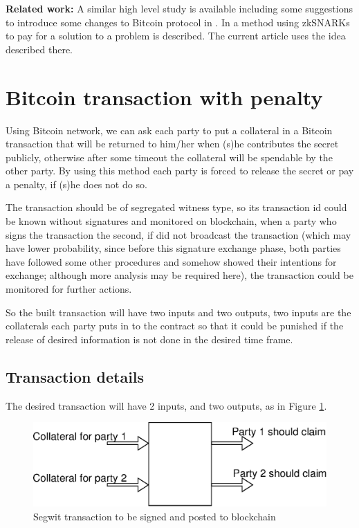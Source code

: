 \documentclass[]{article}
\begin{document}
\textbf{Related work:} A similar high level study is available including some suggestions to introduce some changes to Bitcoin protocol in \cite{andrychowicz}. In \cite{maxwell2016} a method using zkSNARKs\cite{ethzkSNARK} to pay for a solution to a problem is described. The current article uses the idea described there.

\section{Bitcoin transaction with penalty}
Using Bitcoin network, we can ask each party to put a collateral in a Bitcoin transaction that will be returned to him/her when (s)he contributes the secret publicly, otherwise after some timeout the collateral will be spendable by the other party. By using this method each party is forced to release the secret or pay a penalty, if (s)he does not do so.

The transaction should be of segregated witness \cite{segwit} type, so its transaction id could be known without signatures and monitored on blockchain, when a party who signs the transaction the second, if did not broadcast the transaction (which may have lower probability, since before this signature exchange phase, both parties have followed some other procedures and somehow showed their intentions for exchange; although more analysis may be required here), the transaction could be monitored for further actions.

So the built transaction will have two inputs and two outputs, two inputs are the collaterals each party puts in to the contract so that it could be punished if the release of desired information is not done in the desired time frame.

\subsection{Transaction details}

The desired transaction will have 2 inputs, and two outputs, as in Figure \ref{fig:transaction}.

\begin{figure}[h!]
	\centering
	\includegraphics[width=1\textwidth]{images/transaction.eps}
	\caption{Segwit transaction	to be signed and posted to blockchain}
	\label{fig:transaction}
\end{figure}
\end{document}
